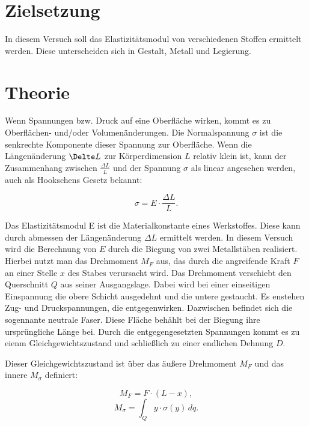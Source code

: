 \section{Zielsetzung}
\label{Zielsetzung}
In diesem Versuch soll das Elastizitätsmodul von verschiedenen Stoffen ermittelt werden.
Diese unterscheiden sich in Gestalt, Metall und Legierung.

\section{Theorie}
\label{Theorie}
Wenn Spannungen bzw. Druck auf eine Oberfläche wirken, kommt es zu Oberflächen- und/oder Volumenänderungen.
Die Normalspannung $\sigma$ ist die senkrechte Komponente dieser Spannung zur Oberfläche.
Wenn die Längenänderung $\Delte L$ zur Körperdimension $L$ relativ klein ist, kann der Zusammenhang zwischen $\frac{\Delta L}{L}$ und der Spannung $\sigma$ als linear angesehen werden, auch als Hookschens Gesetz bekannt:

\begin{equation}
    \sigma = E  \cdot \frac{\Delta L}{L} .
\end{equation}

Das Elastizitätsmodul E ist die Materialkonstante eines Werkstoffes.
Diese kann durch abmessen der Längenänderung $\Delta L$ ermittelt werden.
In diesem Versuch wird die Berechnung von $E$ durch die Biegung von zwei Metallstäben realisiert.
Hierbei nutzt man das Drehmoment $M_F$ aus, das durch die angreifende Kraft $F$ an einer Stelle $x$ des Stabes verursacht wird.
Das Drehmoment verschiebt den Querschnitt $Q$ aus seiner Ausgangslage.
Dabei wird bei einer einseitigen Einspannung die obere Schicht ausgedehnt und die untere gestaucht.
Es enstehen Zug- und Druckspannungen, die entgegenwirken.
Dazwischen befindet sich die sogennante neutrale Faser.
Diese Fläche behählt bei der Biegung ihre ursprüngliche Länge bei.
Durch die entgegengesetzten Spannungen kommt es zu eienm Gleichgewichtszustand und schließlich zu einer endlichen Dehnung $D$.

Dieser Gleichgewichtszustand ist über das äußere Drehmoment $M_F$ und das innere $M_\sigma$ definiert:

\begin{equation}
    M_F = F \cdot (L - x) ,
\end{equation}
\begin{equation}
    M_\sigma = \int_{Q}^{} y \cdot \sigma(y)\, dq .
\end{equation}

